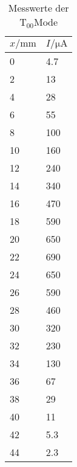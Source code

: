 \begin{table}[H]
  \centering
  \caption{Messwerte der $\text{T}_{00}$Mode}
  \label{tab:tabe3}
    \begin{tabular}{l l}
    \toprule
    $ x / \si{\milli\meter} $ & $ I / \si{\micro\ampere} $ \\
    \midrule
    0 & 4.7 \\
    2 & 13 \\
    4 & 28 \\
    6 & 55 \\
    8 & 100 \\
    10 & 160 \\
    12 & 240 \\
    14 & 340 \\
    16 & 470 \\
    18 & 590 \\
    20 & 650 \\
    22 & 690 \\
    24 & 650 \\
    26 & 590 \\
    28 & 460 \\
    30 & 320 \\
    32 & 230 \\
    34 & 130 \\
    36 & 67 \\
    38 & 29 \\
    40 & 11 \\
    42 & 5.3 \\
    44 & 2.3 \\



          \bottomrule
        \end{tabular}
    \end{table}
